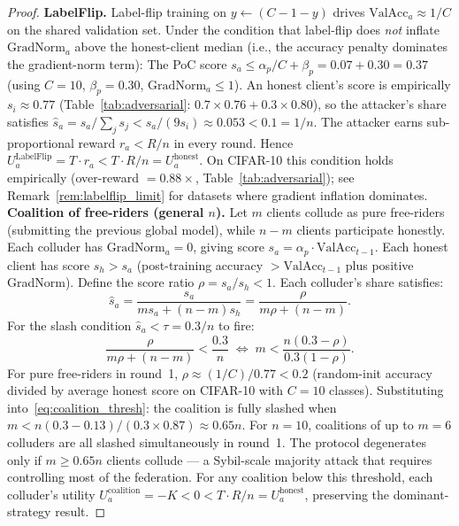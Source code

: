 \documentclass[journal]{IEEEtran}
\theoremstyle{definition}
\theoremstyle{remark}
\begin{document}
\begin{proof}
\textbf{LabelFlip.}
Label-flip training on $y \leftarrow (C{-}1{-}y)$ drives
$\mathrm{ValAcc}_a \approx 1/C$ on the shared validation set.
Under the condition that label-flip does \emph{not} inflate
$\mathrm{GradNorm}_a$ above the honest-client median
(i.e., the accuracy penalty dominates the gradient-norm term):
The PoC score $s_a \leq \alpha_p/C + \beta_p = 0.07 + 0.30 = 0.37$
(using $C = 10$, $\beta_p = 0.30$, $\mathrm{GradNorm}_a \leq 1$).
An honest client's score is empirically $s_i \approx 0.77$
(Table~\ref{tab:adversarial}: $0.7{\times}0.76 + 0.3{\times}0.80$),
so the attacker's share satisfies
$\hat{s}_a = s_a / \sum_j s_j < s_a / (9 s_i) \approx 0.053 < 0.1 = 1/n$.
The attacker earns sub-proportional reward $r_a < R/n$ in every round.
Hence $U_a^{\mathrm{LabelFlip}} = T \cdot r_a < T \cdot R/n
= U_a^{\mathrm{honest}}$.
On CIFAR-10 this condition holds empirically (over-reward $= 0.88{\times}$,
Table~\ref{tab:adversarial}); see Remark~\ref{rem:labelflip_limit}
for datasets where gradient inflation dominates.
\textbf{Coalition of free-riders (general $n$).}
Let $m$ clients collude as pure free-riders (submitting the previous
global model), while $n-m$ clients participate honestly.
Each colluder has $\mathrm{GradNorm}_a = 0$, giving score
$s_a = \alpha_p \cdot \mathrm{ValAcc}_{t-1}$.
Each honest client has score $s_h > s_a$ (post-training accuracy
$> \mathrm{ValAcc}_{t-1}$ plus positive GradNorm).
Define the score ratio $\rho = s_a / s_h < 1$.
Each colluder's share satisfies:
\begin{equation}
  \hat{s}_a = \frac{s_a}{m s_a + (n{-}m)s_h}
             = \frac{\rho}{m\rho + (n{-}m)}.
  \label{eq:coalition_share}
\end{equation}
For the slash condition $\hat{s}_a < \tau = 0.3/n$ to fire:
\begin{equation}
  \frac{\rho}{m\rho + (n{-}m)} < \frac{0.3}{n}
  \;\Longleftrightarrow\;
  m < \frac{n(0.3 - \rho)}{0.3(1 - \rho)}.
  \label{eq:coalition_thresh}
\end{equation}
For pure free-riders in round~1, $\rho \approx (1/C) / 0.77 < 0.2$
(random-init accuracy divided by average honest score on CIFAR-10
with $C{=}10$ classes).
Substituting into~\eqref{eq:coalition_thresh}: the coalition is
fully slashed when $m < n(0.3 - 0.13)/(0.3 \times 0.87) \approx 0.65n$.
For $n{=}10$, coalitions of up to $m{=}6$ colluders are all slashed
simultaneously in round~1.
The protocol degenerates only if $m \geq 0.65n$ clients collude ---
a Sybil-scale majority attack that requires controlling most of the
federation.
For any coalition below this threshold, each colluder's utility
$U_a^{\text{coalition}} = -K < 0 < T \cdot R/n = U_a^{\mathrm{honest}}$,
preserving the dominant-strategy result.
\end{proof}
\end{document}

